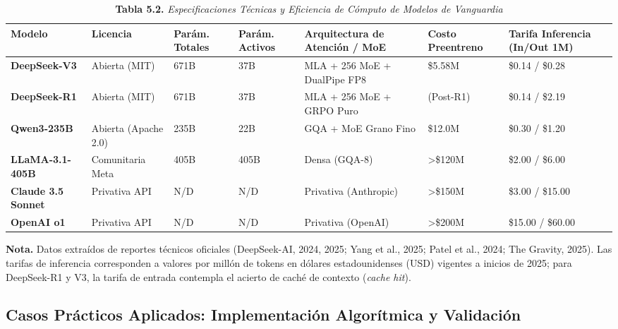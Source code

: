 \begin{table}[htpb!]
\centering
\footnotesize
\renewcommand{\arraystretch}{1.3}
\caption{\textbf{Tabla 5.2.} \textit{Especificaciones Técnicas y Eficiencia de Cómputo de Modelos de Vanguardia}}
\label{tab:modelos_comparativa}
\begin{tabularx}{\textwidth}{>{\raggedright\arraybackslash\bfseries}p{2.3cm} >{\raggedright\arraybackslash}p{2.0cm} >{\centering\arraybackslash}p{1.5cm} >{\centering\arraybackslash}p{1.5cm} >{\raggedright\arraybackslash}X >{\centering\arraybackslash}p{1.6cm} >{\centering\arraybackslash}p{2.2cm}}
\toprule
Modelo & Licencia & Parám. Totales & Parám. Activos & Arquitectura de Atención / MoE & Costo Preentreno & Tarifa Inferencia (In/Out 1M) \\
\midrule
DeepSeek-V3 & Abierta (MIT) & 671B & 37B & MLA + 256 MoE + DualPipe FP8 & \$5.58M & \$0.14 / \$0.28 \\
DeepSeek-R1 & Abierta (MIT) & 671B & 37B & MLA + 256 MoE + GRPO Puro & (Post-R1) & \$0.14 / \$2.19 \\
Qwen3-235B & Abierta (Apache 2.0) & 235B & 22B & GQA + MoE Grano Fino & \$12.0M & \$0.30 / \$1.20 \\
LLaMA-3.1-405B & Comunitaria Meta & 405B & 405B & Densa (GQA-8) & >\$120M & \$2.00 / \$6.00 \\
Claude 3.5 Sonnet & Privativa API & N/D & N/D & Privativa (Anthropic) & >\$150M & \$3.00 / \$15.00 \\
OpenAI o1 & Privativa API & N/D & N/D & Privativa (OpenAI) & >\$200M & \$15.00 / \$60.00 \\
\bottomrule
\end{tabularx}
\vspace{0.1cm}
\raggedright
\scriptsize \textbf{Nota.} Datos extraídos de reportes técnicos oficiales (DeepSeek-AI, 2024, 2025; Yang et al., 2025; Patel et al., 2024; The Gravity, 2025). Las tarifas de inferencia corresponden a valores por millón de tokens en dólares estadounidenses (USD) vigentes a inicios de 2025; para DeepSeek-R1 y V3, la tarifa de entrada contempla el acierto de caché de contexto (\textit{cache hit}).
\end{table}

\newpage

\subsection{Casos Prácticos Aplicados: Implementación Algorítmica y Validación}

